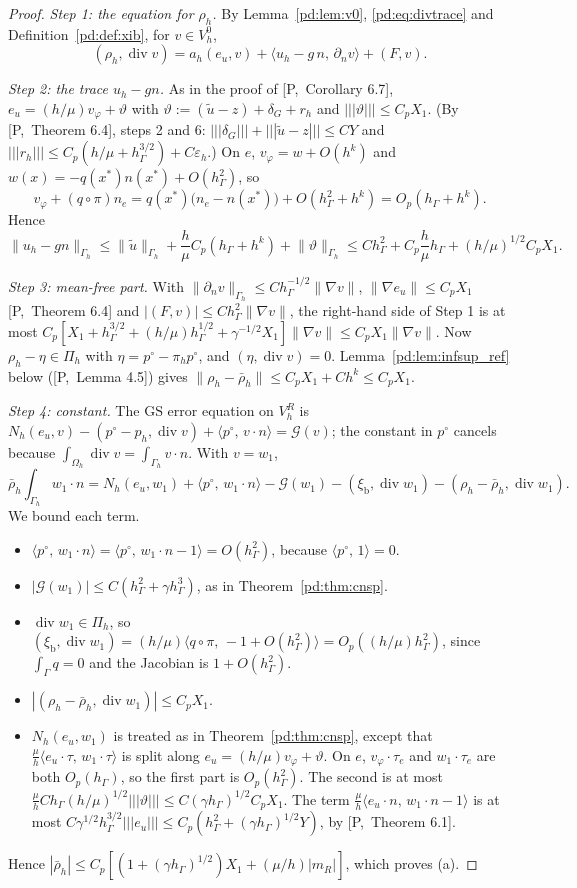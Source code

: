 \documentclass[11pt,reqno]{amsart}
\theoremstyle{plain}
\theoremstyle{definition}
\newcommand{\hG}{h_\Gamma}
\newcommand{\Gh}{\Gamma_h}
\newcommand{\Oh}{\Omega_h}
\newcommand{\VR}{V_h^R}
\newcommand{\VO}{V_h^0}
\newcommand{\Pih}{\Pi_h}
\newcommand{\dn}{\partial_n}
\newcommand{\ut}{\tilde u}
\newcommand{\ip}[2]{\langle #1,\, #2\rangle}
\newcommand{\tnorm}[1]{|\!|\!|#1|\!|\!|}
\newcommand{\norm}[1]{\lVert #1\rVert}
\newcommand{\GS}{\mathrm{GS}}
\newcommand{\eps}{\varepsilon_h}
\renewcommand{\div}{\operatorname{div}}
\newcommand{\Gc}{\mathcal G}
\newcommand{\Pref}[1]{\textup{[P,~#1]}}
\newcommand{\xib}{\xi_{\mathrm b}}
\begin{document}
\begin{proof}
\emph{Step 1: the equation for $\rho_h$.} By Lemma~\ref{pd:lem:v0}, \eqref{pd:eq:divtrace} and Definition~\ref{pd:def:xib}, for $v\in\VO$,
\[
(\rho_h,\div v)=a_h(e_u,v)+\ip{u_h-g\,n}{\dn v}+(F,v).
\]

\emph{Step 2: the trace $u_h-gn$.} As in the proof of \Pref{Corollary 6.7}, $e_u=(h/\mu)v_\varphi+\vartheta$ with $\vartheta:=(\ut-z)+\delta_G+r_h$ and $\tnorm\vartheta\le C_pX_1$. (By \Pref{Theorem 6.4}, steps 2 and 6: $\tnorm{\delta_G}+\tnorm{\ut-z}\le CY$ and $\tnorm{r_h}\le C_p(h/\mu+\hG^{3/2})+C\eps$.) On $e$, $v_\varphi=w+O(h^k)$ and $w(x)=-q(x^\ast)n(x^\ast)+O(\hG^2)$, so
\[
v_\varphi+(q\circ\pi)n_e=q(x^\ast)\bigl(n_e-n(x^\ast)\bigr)+O(\hG^2+h^k)=O_p(\hG+h^k).
\]
Hence
\[
\norm{u_h-gn}_{\Gh}\le\norm\ut_{\Gh}+\frac h\mu C_p(\hG+h^k)+\norm\vartheta_{\Gh}\le C\hG^2+C_p\frac h\mu\hG+(h/\mu)^{1/2}C_pX_1 .
\]

\emph{Step 3: mean-free part.} With $\norm{\dn v}_{\Gh}\le C\hG^{-1/2}\norm{\nabla v}$, $\norm{\nabla e_u}\le C_pX_1$ \Pref{Theorem 6.4} and $|(F,v)|\le C\hG^2\norm{\nabla v}$, the right-hand side of Step 1 is at most $C_p[X_1+\hG^{3/2}+(h/\mu)\hG^{1/2}+\gamma^{-1/2}X_1]\norm{\nabla v}\le C_pX_1\norm{\nabla v}$. Now $\rho_h-\eta\in\Pih$ with $\eta=p^\circ-\pi_hp^\circ$, and $(\eta,\div v)=0$. Lemma~\ref{pd:lem:infsup_ref} below (\Pref{Lemma 4.5}) gives $\norm{\rho_h-\bar\rho_h}\le C_pX_1+Ch^k\le C_pX_1$.

\emph{Step 4: constant.} The $\GS$ error equation on $\VR$ is $N_h(e_u,v)-(p^\circ-p_h,\div v)+\ip{p^\circ}{v\cdot n}=\Gc(v)$; the constant in $p^\circ$ cancels because $\int_{\Oh}\div v=\int_{\Gh}v\cdot n$. With $v=w_1$,
\[
\bar\rho_h\int_{\Gh}w_1\cdot n=N_h(e_u,w_1)+\ip{p^\circ}{w_1\cdot n}-\Gc(w_1)-(\xib,\div w_1)-(\rho_h-\bar\rho_h,\div w_1).
\]
We bound each term.
\begin{itemize}
\item $\ip{p^\circ}{w_1\cdot n}=\ip{p^\circ}{w_1\cdot n-1}=O(\hG^2)$, because $\ip{p^\circ}1=0$.
\item $|\Gc(w_1)|\le C(\hG^2+\gamma\hG^3)$, as in Theorem~\ref{pd:thm:cnsp}.
\item $\div w_1\in\Pih$, so $(\xib,\div w_1)=(h/\mu)\ip{q\circ\pi}{-1+O(\hG^2)}=O_p((h/\mu)\hG^2)$, since $\int_\Gamma q=0$ and the Jacobian is $1+O(\hG^2)$.
\item $|(\rho_h-\bar\rho_h,\div w_1)|\le C_pX_1$.
\item $N_h(e_u,w_1)$ is treated as in Theorem~\ref{pd:thm:cnsp}, except that $\frac\mu h\ip{e_u\cdot\tau}{w_1\cdot\tau}$ is split along $e_u=(h/\mu)v_\varphi+\vartheta$. On $e$, $v_\varphi\cdot\tau_e$ and $w_1\cdot\tau_e$ are both $O_p(\hG)$, so the first part is $O_p(\hG^2)$. The second is at most $\frac\mu hC\hG(h/\mu)^{1/2}\tnorm\vartheta\le C(\gamma\hG)^{1/2}C_pX_1$. The term $\frac\mu h\ip{e_u\cdot n}{w_1\cdot n-1}$ is at most $C\gamma^{1/2}\hG^{3/2}\tnorm{e_u}\le C_p(\hG^2+(\gamma\hG)^{1/2}Y)$, by \Pref{Theorem 6.1}.
\end{itemize}
Hence $|\bar\rho_h|\le C_p[(1+(\gamma\hG)^{1/2})X_1+(\mu/h)|m_R|]$, which proves (a).


\end{proof}
\end{document}
